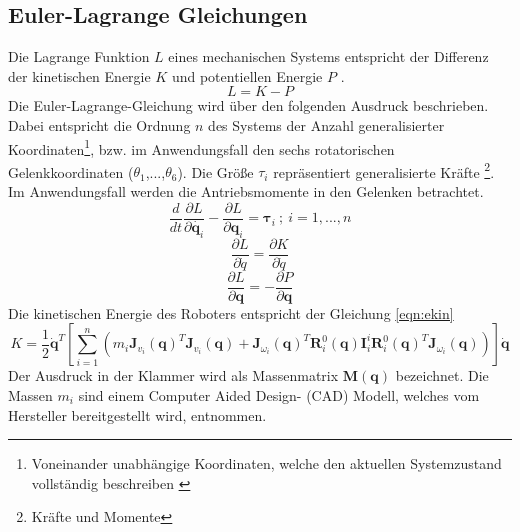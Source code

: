 \subsection{Euler-Lagrange Gleichungen}
Die Lagrange Funktion $L$ eines mechanischen Systems entspricht der Differenz der kinetischen Energie $K$ und potentiellen Energie $P$ \cite[S.~175]{Spong.2020}. 
\begin{equation}
	L = K-P 
\end{equation}
%
%
%
Die Euler-Lagrange-Gleichung wird über den folgenden Ausdruck beschrieben. Dabei entspricht die Ordnung $n$ des Systems der Anzahl generalisierter Koordinaten\footnote{Voneinander unabhängige Koordinaten, welche den aktuellen Systemzustand vollständig beschreiben \cite{Engelke.2008}}, bzw. im Anwendungsfall den sechs rotatorischen Gelenkkoordinaten ($\theta_1$,...,$\theta_6$). Die Größe $\tau_i$ repräsentiert generalisierte Kräfte \footnote{Kräfte und Momente}. Im Anwendungsfall werden die Antriebsmomente in den Gelenken betrachtet. 
%
\begin{equation}
	\frac{d}{dt} \frac{\partial{L}}{\partial{\dot{\bm{q}_i}}}- \frac{\partial{L}}{\partial{\bm{q}_i}} = \bm{\tau}_i \ ;  \ i = 1,...,n 
\end{equation}
%
\begin{equation}
	\frac{\partial{L}}{\partial{\dot{q}}} = \frac{\partial{K}}{\partial{\dot{q}}}
\end{equation}
%
\begin{equation}
	\frac{\partial{L}}{\partial{\bm{q}}} = -\frac{\partial{P}}{\partial{\bm{q}}}
\end{equation}
%
Die kinetischen Energie des Roboters entspricht der Gleichung  \ref{eqn:ekin}
\begin{equation}
	\label{eqn:ekin}
	K = \frac{1}{2} \dot{\bm{\bm{q}}}^T \left[\sum_{i=1}^{n} \left( m_i \bm{J}_{v_i}(\bm{q})^T \bm{J}_{v_i}(\bm{q}) + \bm{J}_{\omega_i}(\bm{q})^T \bm{R}^0_i(\bm{q}) \bm{I}^{i}_{i} \bm{R}^0_i(\bm{q})^T \bm{J}_{\omega_i}(\bm{q}) \right) \right]\dot{\bm{\bm{q}}}
\end{equation}
%
Der Ausdruck in der Klammer wird als Massenmatrix $\bm{M}(\bm{q})$ bezeichnet. 
Die Massen $m_i$ sind einem Computer Aided Design- (CAD) Modell, welches vom Hersteller bereitgestellt wird, entnommen. 
